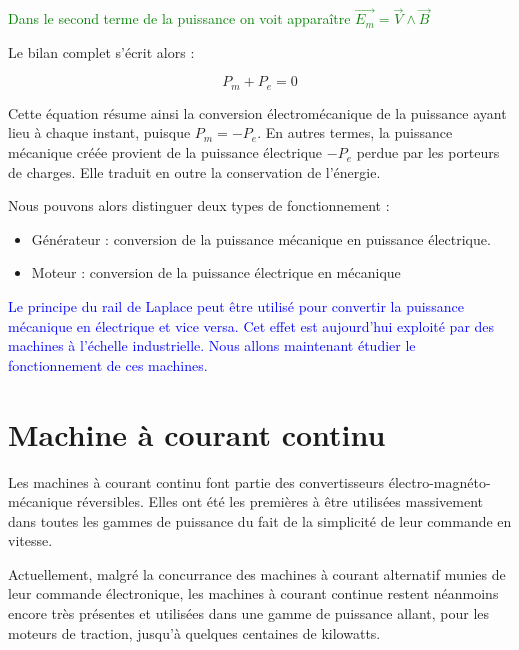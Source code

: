 \documentclass{article}
\begin{document}
\textcolor{green}{Dans le second terme de la puissance on voit apparaître $\vec{E_m}=\vec{V} \land \vec{B}$}

Le bilan complet s'écrit alors :

\begin{equation}
    P_m + P_e = 0
\end{equation}

Cette équation résume ainsi la conversion électromécanique de la puissance ayant lieu à chaque instant, puisque $P_m = - P_e$. En autres termes, la puissance mécanique créée provient de la puissance électrique $-P_e$ perdue par les porteurs de charges. Elle traduit en outre la conservation de l'énergie.\medskip

Nous pouvons alors distinguer deux types de fonctionnement :

\begin{itemize}
    \item Générateur : conversion de la puissance mécanique en puissance électrique.
    \item Moteur : conversion de la puissance électrique en mécanique
\end{itemize}

\textcolor{blue}{Le principe du rail de Laplace peut être utilisé pour convertir la puissance mécanique en électrique et vice versa. Cet effet est aujourd'hui exploité par des machines à l'échelle industrielle. Nous allons maintenant étudier le fonctionnement de ces machines.}


\section{Machine à courant continu}
Les machines à courant continu font partie des convertisseurs électro-magnéto-mécanique réversibles. Elles ont été les premières à être utilisées massivement dans toutes les gammes de puissance du fait de la simplicité de leur commande en vitesse.\medskip


Actuellement, malgré la concurrance des machines à courant alternatif munies de leur commande électronique, les machines à courant continue restent néanmoins encore très présentes et utilisées dans une gamme de puissance allant, pour les moteurs de traction, jusqu'à quelques centaines de kilowatts.\medskip
\end{document}
